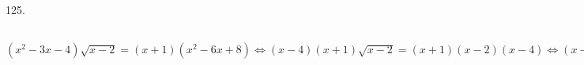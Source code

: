 125. $(x^2-3x-4)\sqrt{x-2}=(x+1)(x^2-6x+8)\Leftrightarrow(x-4)(x+1)\sqrt{x-2}=(x+1)(x-2)(x-4)\Leftrightarrow
(x-4)(x+1)(\sqrt{x-2}-x+2)=0\Leftrightarrow
\begin{cases}\left[\begin{array}{l} x=4,\\ x=-1,\\ \sqrt{x-2}=x-2.\end{array}\right.\\ x\geqslant2.\end{cases}\Leftrightarrow
\begin{cases}\left[\begin{array}{l} x=4,\\ x-2=x^2-4x+4.\end{array}\right.\\ x\geqslant2.\end{cases}\Leftrightarrow
\begin{cases}\left[\begin{array}{l} x=4,\\ (x-2)(x-3)=0.\end{array}\right.\\ x\geqslant2.\end{cases}\Leftrightarrow x\in\{2;3;4\}$\\
